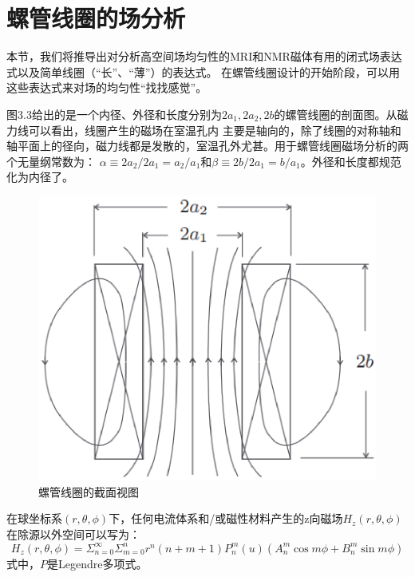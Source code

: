 \section{螺管线圈的场分析}
本节，我们将推导出对分析高空间场均匀性的MRI和NMR磁体有用的闭式场表达式以及简单线圈（“长”、“薄”）的表达式。
在螺管线圈设计的开始阶段，可以用这些表达式来对场的均匀性“找找感觉”。

图3.3给出的是一个内径、外径和长度分别为$2a_1, 2a_2, 2b$的螺管线圈的剖面图。从磁力线可以看出，线圈产生的磁场在室温孔内
主要是轴向的，除了线圈的对称轴和轴平面上的径向，磁力线都是发散的，室温孔外尤甚。用于螺管线圈磁场分析的两个无量纲常数为：
$\alpha\equiv 2a_2/2a_1=a_2/a_1$和$\beta\equiv 2b/2a_1=b/a_1$。外径和长度都规范化为内径了。
\begin{figure}[htbp]
	\centering
	\includegraphics[scale=0.5]{chpt3/figs/fig3.3.eps}
	\caption{螺管线圈的截面视图}
\end{figure}

在球坐标系$(r,\theta,\phi)$下，任何电流体系和/或磁性材料产生的z向磁场$H_z(r,\theta,\phi)$在除源以外空间可以写为：
\begin{equation}\label{eqn:solenoid coil hz}
  H_z (r,\theta,\phi)=\Sigma_{n=0}^\infty \Sigma_{m=0}^n r^n (n+m+1) P_n^m(u)(A_n^m\cos m\phi+B_n^m\sin m\phi)
\end{equation}
式中，$P$是Legendre多项式。

